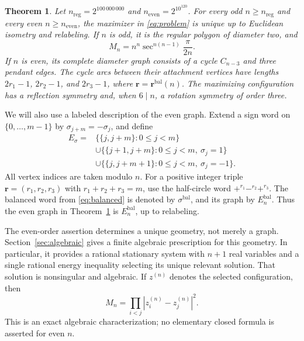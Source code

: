 \documentclass[11pt,reqno]{amsart}
\numberwithin{equation}{section}
\newtheorem{theorem}{Theorem}[section]
\theoremstyle{definition}
\theoremstyle{remark}
\newcommand{\bal}{\mathrm{bal}}
\begin{document}
\begin{theorem}\label{thm:main}
Let $n_{\mathrm{reg}}=2^{100\,000\,000}$ and $n_{\mathrm{even}}=2^{10^{120}}$. For every odd $n\ge n_{\mathrm{reg}}$ and every even $n\ge n_{\mathrm{even}}$, the maximizer in \eqref{eq:problem} is unique up to Euclidean isometry and relabeling. If $n$ is odd, it is the regular polygon of diameter two, and
\begin{equation}\label{eq:odd}
 M_n=n^n\sec^{n(n-1)}\frac{\pi}{2n}.
\end{equation}
If $n$ is even, its complete diameter graph consists of a cycle $C_{n-3}$ and three pendant edges. The cycle arcs between their attachment vertices have lengths $2r_1-1$, $2r_2-1$, and $2r_3-1$, where $\mathbf r=\mathbf r^{\bal}(n)$. The maximizing configuration has a reflection symmetry and, when $6\mid n$, a rotation symmetry of order three.
\end{theorem}

We will also use a labeled description of the even graph. Extend a sign word on $\{0,\ldots,m-1\}$ by $\sigma_{j+m}=-\sigma_j$, and define
\begin{equation}\label{eq:graph}
 \begin{split}
 E_\sigma={}&\{\{j,j+m\}:0\le j<m\}\\
 &\cup\{\{j+1,j+m\}:0\le j<m,\ \sigma_j=1\}\\
 &\cup\{\{j,j+m+1\}:0\le j<m,\ \sigma_j=-1\}.
 \end{split}
\end{equation}
All vertex indices are taken modulo $n$. For a positive integer triple $\mathbf r=(r_1,r_2,r_3)$ with $r_1+r_2+r_3=m$, use the half-circle word $+^{r_1}-^{r_2}+^{r_3}$. The balanced word from \eqref{eq:balanced} is denoted by $\sigma^{\bal}$, and its graph by $E_n^{\bal}$. Thus the even graph in Theorem~\ref{thm:main} is $E_n^{\bal}$, up to relabeling.


The even-order assertion determines a unique geometry, not merely a graph. Section~\ref{sec:algebraic} gives a finite algebraic prescription for this geometry. In particular, it provides a rational stationary system with $n+1$ real variables and a single rational energy inequality selecting its unique relevant solution. That solution is nonsingular and algebraic. If $z^{(n)}$ denotes the selected configuration, then
\begin{equation}\label{eq:evenexact}
 M_n=\prod_{i<j}|z_i^{(n)}-z_j^{(n)}|^2.
\end{equation}
This is an exact algebraic characterization; no elementary closed formula is asserted for even $n$.
\end{document}
